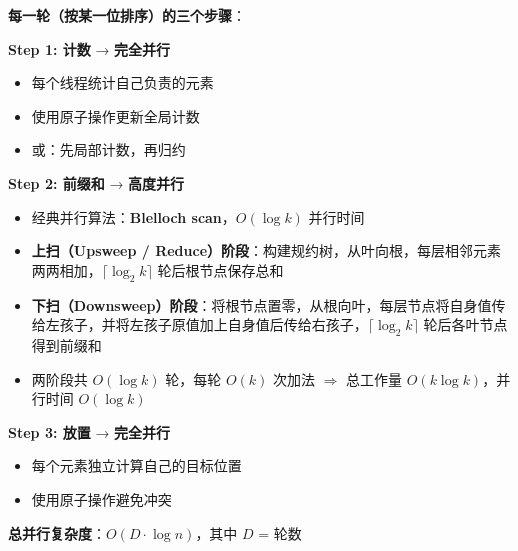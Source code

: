 \documentclass[12pt, a4paper]{ctexart}
\begin{document}
\begin{gpubox}[基数排序的GPU并行性]

\textbf{每一轮（按某一位排序）的三个步骤}：

\textbf{Step 1: 计数} → \textbf{完全并行}
\begin{itemize}
    \item 每个线程统计自己负责的元素
    \item 使用原子操作更新全局计数
    \item 或：先局部计数，再归约
\end{itemize}

\textbf{Step 2: 前缀和} → \textbf{高度并行}
\begin{itemize}
    \item 经典并行算法：\textbf{Blelloch scan}，$O(\log k)$ 并行时间
    \item \textbf{上扫（Upsweep / Reduce）阶段}：构建规约树，从叶向根，每层相邻元素两两相加，$\lceil \log_2 k \rceil$ 轮后根节点保存总和
    \item \textbf{下扫（Downsweep）阶段}：将根节点置零，从根向叶，每层节点将自身值传给左孩子，并将左孩子原值加上自身值后传给右孩子，$\lceil \log_2 k \rceil$ 轮后各叶节点得到前缀和
    \item 两阶段共 $O(\log k)$ 轮，每轮 $O(k)$ 次加法 $\Rightarrow$ 总工作量 $O(k \log k)$，并行时间 $O(\log k)$
\end{itemize}

\textbf{Step 3: 放置} → \textbf{完全并行}
\begin{itemize}
    \item 每个元素独立计算自己的目标位置
    \item 使用原子操作避免冲突
\end{itemize}

\textbf{总并行复杂度}：$O(D \cdot \log n)$，其中 $D$ = 轮数

\end{gpubox}
\end{document}
